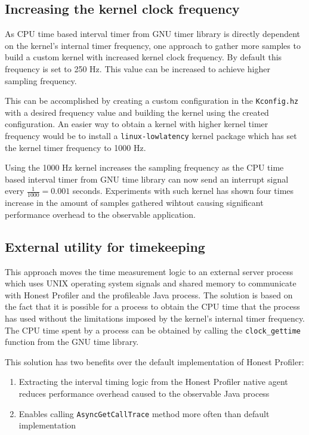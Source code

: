 \documentclass[..thesis.tex]{subfiles}
\begin{document}
\subsection{Increasing the kernel clock frequency}
As CPU time based interval timer from GNU timer library is directly dependent on the kernel's internal timer frequency, one approach to gather more samples to build a custom kernel with increased kernel clock frequency. By default this frequency is set to 250 Hz.\cite{torvalds_linux:_2018} This value can be increased to achieve higher sampling frequency. 

This can be accomplished by creating a custom configuration in the \texttt{Kconfig.hz} with a desired frequency value and building the kernel using the created configuration. An easier way to obtain a kernel with higher kernel timer frequency would be to install a \texttt{linux-lowlatency} kernel package which has set the kernel timer frequency to 1000 Hz.

Using the 1000 Hz kernel increases the sampling frequency as the CPU time based interval timer from GNU time library can now send an interrupt signal every $\frac{1}{1000} = 0.001$ seconds. Experiments with such kernel has shown four times increase in the amount of samples gathered wihtout causing significant performance overhead to the observable application.

\subsection{External utility for timekeeping}
This approach moves the time measurement logic to an external server process which uses UNIX operating system signals and shared memory to communicate with Honest Profiler and the profileable Java process. The solution is based on the fact that it is possible for a process to obtain the CPU time that the process has used without the limitations imposed by the kernel's internal timer frequency. The CPU time spent by a process can be obtained by calling the \texttt{clock\_\-gettime} function from the GNU time library.

This solution has two benefits over the default implementation of Honest Profiler:
\begin{enumerate}
	\item Extracting the interval timing logic from the Honest Profiler native agent reduces performance overhead caused to the observable Java process
	\item Enables calling \texttt{Async\-Get\-Call\-Trace} method more often than default implementation
\end{enumerate}
\end{document}
